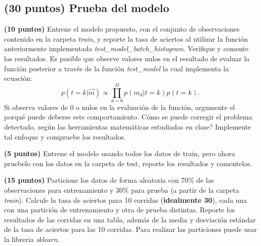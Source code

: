 \documentclass[spanish]{article}
\begin{document}
\begin{myEnumerate}
\subsection{(30 puntos) Prueba del modelo}
\begin{myEnumerate}
\item \textbf{(10 puntos)} Entrene el modelo propuesto, con el conjunto
de observaciones contenido en la carpeta \emph{train}, y reporte la
tasa de aciertos al utilizar la funci\'{o}n anteriormente implementada \emph{test\_model\_batch\_histogram}.
Verifique y comente los resultados. Es posible que observe valores
nulos en el resultado de evaluar la funci\'{o}n posterior a trav\'{e}s
de la funci\'{o}n \emph{test\_model }la cual implementa la ecuaci\'{o}n:\emph{
}
\[
p\left(t=k|\overrightarrow{m}\right)\propto\prod_{d=0}^{D}p\left(m_{d}|t=k\right)p\left(t=k\right).
\]
Si\emph{ }observa valores de 0 o nulos en la evaluaci\'{o}n de la
funci\'{o}n, argumente el porqu\'{e} puede deberse este comportamiento\emph{.
\textquestiondown }C\'{o}mo se puede corregir el problema detectado,
seg\'{u}n las herramientas matem\'{a}ticas estudiadas en clase? Implemente
tal enfoque y compruebe los resultados. 
\item \textbf{(5 puntos)} Entrene el modelo usando todos los datos de train,
pero ahora pruebelo con los datos en la carpeta de test, reporte los
resultados y comentelos.
\item \textbf{(15 puntos)} Particione los datos de forma aleatoria con 70\%
de las observaciones para entrenamiento y 30\% para prueba (a partir
de la carpeta \emph{train}). Calcule la tasa de aciertos para 10 corridas
(\textbf{idealmente 30}), cada una con una partici\'{o}n de entrenamiento
y otra de prueba distintas. Reporte los resultados de las corridas
en una tabla, adem\'{a}s de la media y desviaci\'{o}n est\'{a}ndar
de la tasa de aciertos para las 10 corridas. Para realizar las particiones
puede usar la libreria \emph{sklearn. }
\end{myEnumerate}


\end{myEnumerate}
\end{document}
